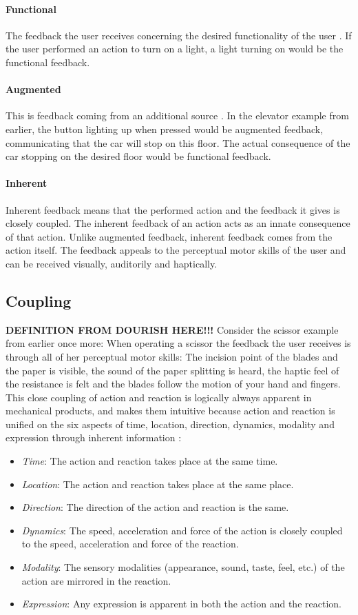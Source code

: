 \paragraph{Functional} The feedback the user receives concerning the desired functionality of the user \cite{frogger}. If the user performed an action to turn on a light, a light turning on would be the functional feedback.
\paragraph{Augmented} This is feedback coming from an additional source \cite{frogger}. In the elevator example from earlier, the button lighting up when pressed would be augmented feedback, communicating that the car will stop on this floor. The actual consequence of the car stopping on the desired floor would be functional feedback.
\paragraph{Inherent} Inherent feedback means that the performed action and the feedback it gives is closely coupled. The inherent feedback of an action acts as an innate consequence of that action. Unlike augmented feedback, inherent feedback comes from the action itself. The feedback appeals to the perceptual motor skills of the user and can be received visually, auditorily and haptically.

\subsection{Coupling}
\textbf{DEFINITION FROM DOURISH HERE!!!}
Consider the scissor example from earlier once more: When operating a scissor the feedback the user receives is through all of her perceptual motor skills: The incision point of the blades and the paper is visible, the sound of the paper splitting is heard, the haptic feel of the resistance is felt and the blades follow the motion of your hand and fingers. This close coupling of action and reaction is logically always apparent in mechanical products, and makes them intuitive because action and reaction is unified on the six aspects of time, location, direction, dynamics, modality and expression through inherent information \cite{frogger} \cite{transbehav}:
\begin{itemize}
  \item \textit{Time}: The action and reaction takes place at the same time.
  \item \textit{Location}: The action and reaction takes place at the same place.
  \item \textit{Direction}: The direction of the action and reaction is the same.
  \item \textit{Dynamics}: The speed, acceleration and force of the action is closely coupled to the speed, acceleration and force of the reaction.
  \item \textit{Modality}: The sensory modalities (appearance, sound, taste, feel, etc.) of the action are mirrored in the reaction.
  \item \textit{Expression}: Any expression is apparent in both the action and the reaction.
\end{itemize}

